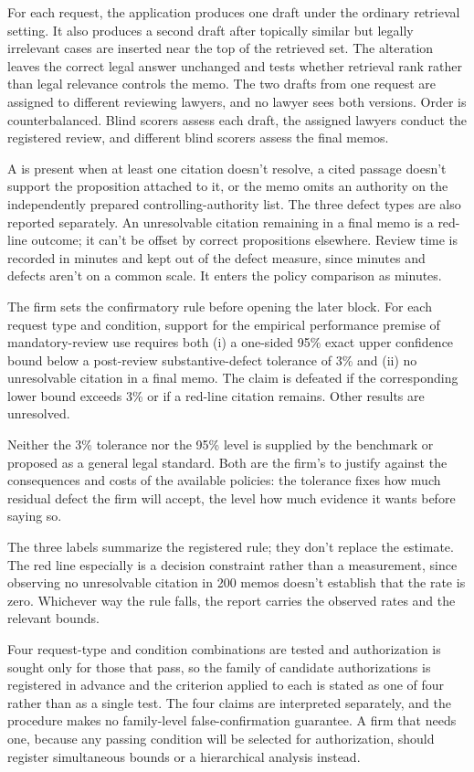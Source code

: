 \documentclass[12pt]{article}
\begin{document}
For each request, the application produces one draft under the ordinary retrieval setting. It also produces a second draft after topically similar but legally irrelevant cases are inserted near the top of the retrieved set. The alteration leaves the correct legal answer unchanged and tests whether retrieval rank rather than legal relevance controls the memo. The two drafts from one request are assigned to different reviewing lawyers, and no lawyer sees both versions. Order is counterbalanced. Blind scorers assess each draft, the assigned lawyers conduct the registered review, and different blind scorers assess the final memos.

A  is present when at least one citation doesn't resolve, a cited passage doesn't support the proposition attached to it, or the memo omits an authority on the independently prepared controlling-authority list. The three defect types are also reported separately. An unresolvable citation remaining in a final memo is a red-line outcome; it can't be offset by correct propositions elsewhere. Review time is recorded in minutes and kept out of the defect measure, since minutes and defects aren't on a common scale. It enters the policy comparison as minutes.

The firm sets the confirmatory rule before opening the later block. For each request type and condition, support for the empirical performance premise of mandatory-review use requires both (i) a one-sided 95\% exact upper confidence bound below a post-review substantive-defect tolerance of 3\% and (ii) no unresolvable citation in a final memo. The claim is defeated if the corresponding lower bound exceeds 3\% or if a red-line citation remains. Other results are unresolved.

Neither the 3\% tolerance nor the 95\% level is supplied by the benchmark or proposed as a general legal standard. Both are the firm's to justify against the consequences and costs of the available policies: the tolerance fixes how much residual defect the firm will accept, the level how much evidence it wants before saying so.

The three labels summarize the registered rule; they don't replace the estimate. The red line especially is a decision constraint rather than a measurement, since observing no unresolvable citation in 200 memos doesn't establish that the rate is zero. Whichever way the rule falls, the report carries the observed rates and the relevant bounds.

Four request-type and condition combinations are tested and authorization is sought only for those that pass, so the family of candidate authorizations is registered in advance and the criterion applied to each is stated as one of four rather than as a single test. The four claims are interpreted separately, and the procedure makes no family-level false-confirmation guarantee. A firm that needs one, because any passing condition will be selected for authorization, should register simultaneous bounds or a hierarchical analysis instead.
\end{document}
